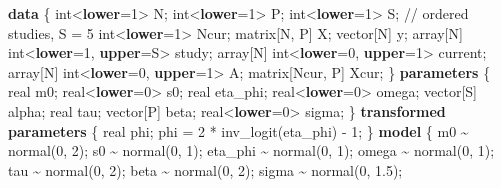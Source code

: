 \documentclass[
  letterpaper,
  DIV=11,
  numbers=noendperiod]{scrartcl}
\newenvironment{Shaded}{\begin{snugshade}}{\end{snugshade}}
\newcommand{\CommentTok}[1]{\textcolor[rgb]{0.37,0.37,0.37}{#1}}
\newcommand{\DataTypeTok}[1]{\textcolor[rgb]{0.68,0.00,0.00}{#1}}
\newcommand{\DecValTok}[1]{\textcolor[rgb]{0.68,0.00,0.00}{#1}}
\newcommand{\FloatTok}[1]{\textcolor[rgb]{0.68,0.00,0.00}{#1}}
\newcommand{\KeywordTok}[1]{\textcolor[rgb]{0.00,0.23,0.31}{\textbf{#1}}}
\newcommand{\NormalTok}[1]{\textcolor[rgb]{0.00,0.23,0.31}{#1}}
\begin{document}
\begin{Shaded}
\begin{Highlighting}[]
\KeywordTok{data}\NormalTok{ \{}
  \DataTypeTok{int}\NormalTok{\textless{}}\KeywordTok{lower}\NormalTok{=}\DecValTok{1}\NormalTok{\textgreater{} N;}
  \DataTypeTok{int}\NormalTok{\textless{}}\KeywordTok{lower}\NormalTok{=}\DecValTok{1}\NormalTok{\textgreater{} P;}
  \DataTypeTok{int}\NormalTok{\textless{}}\KeywordTok{lower}\NormalTok{=}\DecValTok{1}\NormalTok{\textgreater{} S;                 }\CommentTok{// ordered studies, S = 5}
  \DataTypeTok{int}\NormalTok{\textless{}}\KeywordTok{lower}\NormalTok{=}\DecValTok{1}\NormalTok{\textgreater{} Ncur;}
  \DataTypeTok{matrix}\NormalTok{[N, P] X;}
  \DataTypeTok{vector}\NormalTok{[N] y;}
  \DataTypeTok{array}\NormalTok{[N] }\DataTypeTok{int}\NormalTok{\textless{}}\KeywordTok{lower}\NormalTok{=}\DecValTok{1}\NormalTok{, }\KeywordTok{upper}\NormalTok{=S\textgreater{} study;}
  \DataTypeTok{array}\NormalTok{[N] }\DataTypeTok{int}\NormalTok{\textless{}}\KeywordTok{lower}\NormalTok{=}\DecValTok{0}\NormalTok{, }\KeywordTok{upper}\NormalTok{=}\DecValTok{1}\NormalTok{\textgreater{} current;}
  \DataTypeTok{array}\NormalTok{[N] }\DataTypeTok{int}\NormalTok{\textless{}}\KeywordTok{lower}\NormalTok{=}\DecValTok{0}\NormalTok{, }\KeywordTok{upper}\NormalTok{=}\DecValTok{1}\NormalTok{\textgreater{} A;}
  \DataTypeTok{matrix}\NormalTok{[Ncur, P] Xcur;}
\NormalTok{\}}
\KeywordTok{parameters}\NormalTok{ \{}
  \DataTypeTok{real}\NormalTok{ m0;}
  \DataTypeTok{real}\NormalTok{\textless{}}\KeywordTok{lower}\NormalTok{=}\DecValTok{0}\NormalTok{\textgreater{} s0;}
  \DataTypeTok{real}\NormalTok{ eta\_phi;}
  \DataTypeTok{real}\NormalTok{\textless{}}\KeywordTok{lower}\NormalTok{=}\DecValTok{0}\NormalTok{\textgreater{} omega;}
  \DataTypeTok{vector}\NormalTok{[S] alpha;}
  \DataTypeTok{real}\NormalTok{ tau;}
  \DataTypeTok{vector}\NormalTok{[P] beta;}
  \DataTypeTok{real}\NormalTok{\textless{}}\KeywordTok{lower}\NormalTok{=}\DecValTok{0}\NormalTok{\textgreater{} sigma;}
\NormalTok{\}}
\KeywordTok{transformed parameters}\NormalTok{ \{}
  \DataTypeTok{real}\NormalTok{ phi;}
\NormalTok{  phi = }\DecValTok{2}\NormalTok{ * inv\_logit(eta\_phi) {-} }\DecValTok{1}\NormalTok{;}
\NormalTok{\}}
\KeywordTok{model}\NormalTok{ \{}
\NormalTok{  m0    \textasciitilde{} normal(}\DecValTok{0}\NormalTok{, }\DecValTok{2}\NormalTok{);}
\NormalTok{  s0    \textasciitilde{} normal(}\DecValTok{0}\NormalTok{, }\DecValTok{1}\NormalTok{);}
\NormalTok{  eta\_phi \textasciitilde{} normal(}\DecValTok{0}\NormalTok{, }\DecValTok{1}\NormalTok{);}
\NormalTok{  omega \textasciitilde{} normal(}\DecValTok{0}\NormalTok{, }\DecValTok{1}\NormalTok{);}
\NormalTok{  tau   \textasciitilde{} normal(}\DecValTok{0}\NormalTok{, }\DecValTok{2}\NormalTok{);}
\NormalTok{  beta  \textasciitilde{} normal(}\DecValTok{0}\NormalTok{, }\DecValTok{2}\NormalTok{);}
\NormalTok{  sigma \textasciitilde{} normal(}\DecValTok{0}\NormalTok{, }\FloatTok{1.5}\NormalTok{);}


\end{Highlighting}
\end{Shaded}
\end{document}
